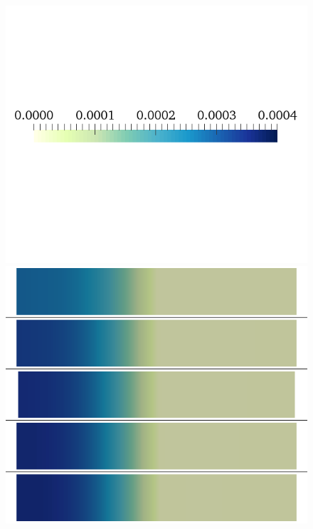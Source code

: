 \documentclass{article}
\begin{document}
%
\begin{figure}
\begin{minipage}{0.5\textwidth}
\includegraphics[trim=0cm 7cm 0cm 6cm, clip=true, width=1\linewidth]{legend_cai}
\includegraphics[trim=0cm 0cm 0cm 0cm, clip=true, width=1\linewidth]{cai_gcal}
    \end{minipage}
    \begin{minipage}{0.5\textwidth}

\end{minipage}
\end{figure}
\end{document}
